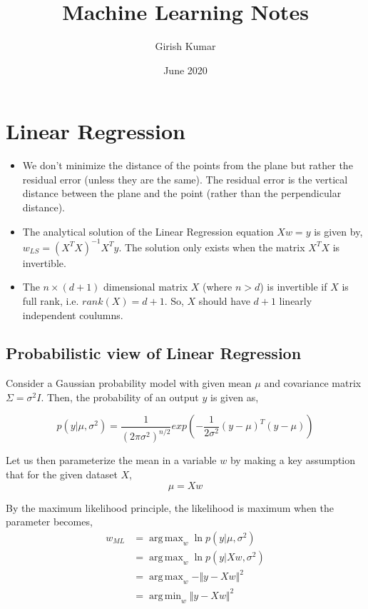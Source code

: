 \documentclass{article}
\title{Machine Learning Notes}
\author{Girish Kumar }
\date{June 2020}
\DeclareMathOperator*{\argmax}{arg\,max}
\DeclareMathOperator*{\argmin}{arg\,min}
\begin{document}
\maketitle

\setcounter{secnumdepth}{0}
\tableofcontents

\section{Linear Regression}

\begin{itemize}
    \item We don't minimize the distance of the points from the plane but rather the residual error (unless they are the same). The residual error is the vertical distance between the plane and the point (rather than the perpendicular distance).
    
    \item The analytical solution of the Linear Regression equation $Xw=y$ is given by, $w_{LS}=(X^TX)^{-1}X^Ty$. The solution only exists when the matrix $X^TX$ is invertible.
    
    \item The $n \times (d+1)$ dimensional matrix $X$ (where $n>d$) is invertible if $X$ is full rank, i.e. $rank(X)=d+1$. So, $X$ should have $d+1$ linearly independent coulumns.
\end{itemize}

\subsection{Probabilistic view of Linear Regression}

Consider a Gaussian probability model with given mean $\mu$ and covariance matrix $\Sigma = \sigma^2I$. Then, the probability of an output $y$ is given as,

\begin{equation*}
    p(y\vert \mu, \sigma^2) = \frac{1}{(2\pi\sigma^2)^{n/2}}exp\left(-\frac{1}{2\sigma^2}(y-\mu)^T(y-\mu)\right) 
\end{equation*}

Let us then parameterize the mean in a variable $w$ by making a key assumption that for the given dataset $X$,
\begin{equation*}
    \mu = Xw
\end{equation*}

By the maximum likelihood principle, the likelihood is maximum when the parameter becomes, 
\begin{align*}
    w_{ML} &= \argmax_w \ln{p(y\vert \mu, \sigma^2)}\\
        &= \argmax_w \ln{p(y\vert Xw, \sigma^2)}\\
        & = \argmax_w -\Vert y-Xw \Vert^2\\
        & = \argmin_w \Vert y-Xw \Vert^2
\end{align*}
\end{document}
